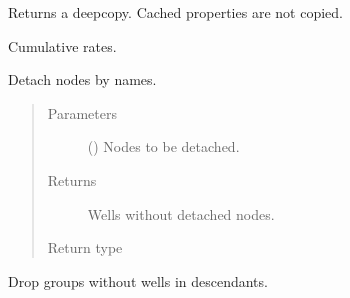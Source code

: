 \documentclass[letterpaper,10pt,english]{sphinxmanual}
\begin{document}
\begin{fulllineitems}
\begin{fulllineitems}
\label{\detokenize{api/wells:geology.src.wells.Wells.copy}}
Returns a deepcopy. Cached properties are not copied.

\end{fulllineitems}


\begin{fulllineitems}
\label{\detokenize{api/wells:geology.src.wells.Wells.cum_rates}}
Cumulative rates.

\end{fulllineitems}


\begin{fulllineitems}
\label{\detokenize{api/wells:geology.src.wells.Wells.drop}}
Detach nodes by names.
\begin{quote}\begin{description}
\item[{Parameters}] \leavevmode
{} (\sphinxstyleliteralemphasis{\sphinxupquote{, }}) \textendash{} Nodes to be detached.

\item[{Returns}] \leavevmode
{} \textendash{} Wells without detached nodes.

\item[{Return type}] \leavevmode
{\hyperref[\detokenize{api/wells:geology.src.wells.Wells}]{}}

\end{description}\end{quote}

\end{fulllineitems}


\begin{fulllineitems}
\label{\detokenize{api/wells:geology.src.wells.Wells.drop_empty_groups}}
Drop groups without wells in descendants.


\end{fulllineitems}
\end{fulllineitems}
\end{document}
